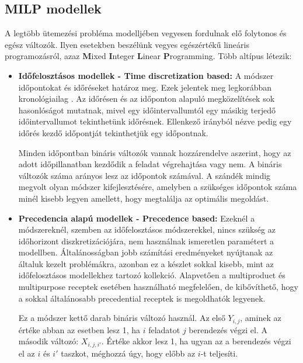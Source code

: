 \subsection{MILP modellek}
A legtöbb ütemezési probléma modelljében vegyesen fordulnak elő folytonos és egész változók. Ilyen esetekben beszélünk vegyes egészértékű lineáris programozásról, azaz \textbf{M}ixed \textbf{I}nteger \textbf{L}inear \textbf{P}rogramming. Több altípus létezik:
\begin{itemize}
  \item[] \textbf{Időfelosztásos modellek - Time discretization based:} A módszer időpontokat és időréseket határoz meg. Ezek jelentek meg legkorábban kronológiailag \cite{kondili}. Az időrésen és az időponton alapuló megközelítések \cite{susarla} sok hasonlóságot mutatnak, mivel egy időintervallumtól egy másikig terjedő időintervallumot tekinthetünk időrésnek. Ellenkező irányból nézve pedig egy időrés kezdő időpontját tekinthetjük egy időpontnak.  
  
  Minden időpontban bináris változók vannak hozzárendelve aszerint, hogy az adott időpillanatban kezdődik a feladat végrehajtása vagy nem. A bináris változók száma arányos lesz az időpontok számával. A szándék mindig megvolt olyan módszer kifejlesztésére, amelyben a szükséges időpontok száma minél kisebb legyen amellett, hogy megtalálja az optimális megoldást. 
  
  \item[] \textbf{Precedencia alapú modellek - Precedence based:} Ezeknél a módszereknél, szemben az időfelosztásos módszerekkel, nincs szükség az időhorizont diszkretizációjára, nem használnak ismeretlen paramétert a modellben. Általánosságban jobb számítási eredményeket nyújtanak az általuk kezelt problémákra, azonban ez a készlet sokkal kisebb, mint az időfelosztásos modellekhez tartozó kollekció. Alapvetően a multiproduct és multipurpose receptek esetében használható megfelelően, de kibővíthető, hogy a sokkal általánosabb precedential receptek is megoldhatók legyenek. 
  
  Ez a módszer kettő darab bináris változó használ. Az első $Y_{i,j}$, aminek az értéke abban az esetben lesz 1, ha $i$ feladatot $j$ berendezés végzi el. A második változó: $X_{i,j,i'}$. Értéke akkor lesz 1, ha ugyan az a berendezés végzi el az $i$ és $i'$ taszkot, méghozzá úgy, hogy előbb az $i$-t teljesíti. 
\end{itemize}
